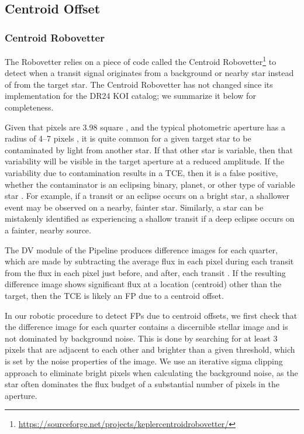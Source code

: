 \subsection{Centroid Offset}
\subsubsection{Centroid Robovetter}
\label{s:centroidrv}
The Robovetter relies on a piece of code called the Centroid Robovetter\footnote{\url{https://sourceforge.net/projects/keplercentroidrobovetter/}} \citep{Mullally2017} to detect when a transit signal originates from a background or nearby star instead of from the target star. The Centroid Robovetter has not changed since its implementation for the DR24 KOI catalog; we summarize it below for completeness. 

Given that  pixels are 3.98\arcsec{} square \citep{Koch2010}, and the typical photometric aperture has a radius of 4--7 pixels \citep{Bryson2010b}, it is quite common for a given target star to be contaminated by light from another star. If that other star is variable, then that variability will be visible in the target aperture at a reduced amplitude. If the variability due to contamination results in a TCE, then it is a false positive, whether the contaminator is an eclipsing binary, planet, or other type of variable star \citep{Bryson2013}. For example, if a transit or an eclipse occurs on a bright star, a shallower event may be observed on a nearby, fainter star. Similarly, a star can be mistakenly identified as experiencing a shallow transit if a deep eclipse occurs on a fainter, nearby source.

The DV module of the \kepler{} Pipeline produces difference images for each quarter, which are made by subtracting the average flux in each pixel during each transit from the flux in each pixel just before, and after, each transit \citep{Bryson2013}. If the resulting difference image shows significant flux at a location (centroid) other than the target, then the TCE is likely an FP due to a centroid offset.

In our robotic procedure to detect FPs due to centroid offsets, we first check that the difference image for each quarter contains a discernible stellar image and is not dominated by background noise. This is done by searching for at least 3 pixels that are adjacent to each other and brighter than a given threshold, which is set by the noise properties of the image. We use an iterative sigma clipping approach to eliminate bright pixels when calculating the background noise, as the star often dominates the flux budget of a substantial number of pixels in the aperture.


